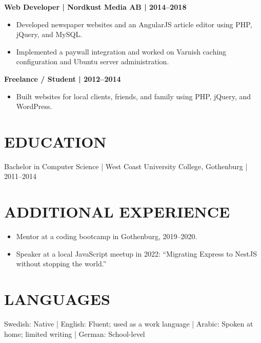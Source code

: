 \documentclass[11pt,a4paper]{article}
\begin{document}
\textbf{Web Developer | Nordkust Media AB | 2014–2018}
\begin{itemize}
\item Developed newspaper websites and an AngularJS article editor using PHP, jQuery, and MySQL.
\item Implemented a paywall integration and worked on Varnish caching configuration and Ubuntu server administration.
\end{itemize}

\textbf{Freelance / Student | 2012–2014}
\begin{itemize}
\item Built websites for local clients, friends, and family using PHP, jQuery, and WordPress.
\end{itemize}

\section*{EDUCATION}
Bachelor in Computer Science | West Coast University College, Gothenburg | 2011–2014

\section*{ADDITIONAL EXPERIENCE}
\begin{itemize}
\item Mentor at a coding bootcamp in Gothenburg, 2019–2020.
\item Speaker at a local JavaScript meetup in 2022: “Migrating Express to NestJS without stopping the world.”
\end{itemize}

\section*{LANGUAGES}
Swedish: Native | English: Fluent; used as a work language | Arabic: Spoken at home; limited writing | German: School-level
\end{document}
